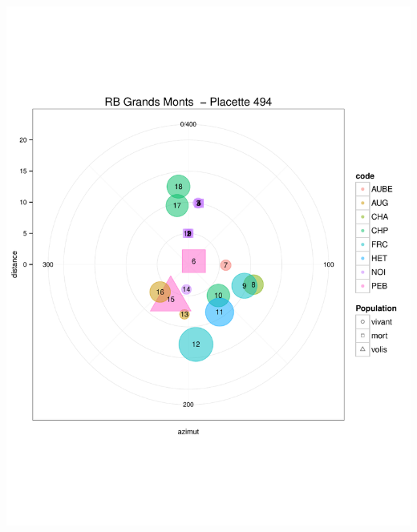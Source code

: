 \documentclass[a4paper]{book}\usepackage[]{graphicx}\usepackage[]{color}
\makeatletter
\def\maxwidth{ %
  \ifdim\Gin@nat@width>\linewidth
    \linewidth
  \else
    \Gin@nat@width
  \fi
}
\newenvironment{knitrout}{}{} %
\makeatother
\begin{document}
\begin{knitrout}
{\centering \includegraphics[width=\maxwidth]{Figures/PlanArbres-56} 

}





\end{knitrout}
\end{document}

